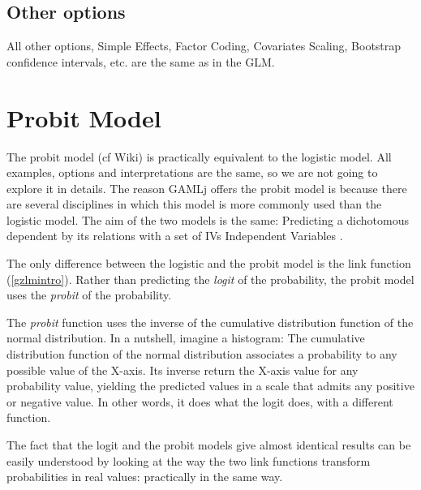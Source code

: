 \documentclass[
]{book}
\begin{document}
\hypertarget{other-options}{%
\subsection{Other options}\label{other-options}}

All other options, {Simple Effects}, {Factor Coding}, {Covariates Scaling}, {Bootstrap} confidence intervals, etc. are the same as in the GLM.

\hypertarget{probit}{%
\section{Probit Model}\label{probit}}

The probit model (cf Wiki) is practically equivalent to the logistic model. All examples, options and interpretations are the same, so we are not going to explore it in details. The reason {GAMLj} offers the probit model is because there are several disciplines in which this model is more commonly used than the logistic model. The aim of the two models is the same: Predicting a dichotomous dependent by its relations with a set of {IVs {Independent Variables} }.

The only difference between the logistic and the probit model is the link function (\ref{gzlmintro}). Rather than predicting the \emph{logit} of the probability, the probit model uses the \emph{probit} of the probability.

The \emph{probit} function uses the inverse of the cumulative distribution function of the normal distribution. In a nutshell, imagine a histogram: The cumulative distribution function of the normal distribution associates a probability to any possible value of the X-axis. Its inverse return the X-axis value for any probability value, yielding the predicted values in a scale that admits any positive or negative value. In other words, it does what the logit does, with a different function.

The fact that the logit and the probit models give almost identical results can be easily understood by looking at the way the two link functions transform probabilities in real values: practically in the same way.
\end{document}
